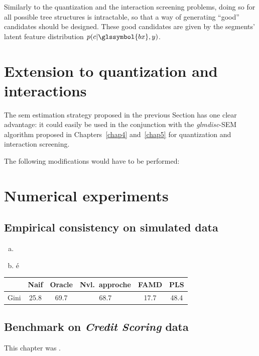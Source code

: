 Similarly to the quantization and the interaction screening problems, doing so for all possible tree structures is intractable, so that a way of generating ``good'' candidates should be designed. These good candidates are given by the segments' latent feature distribution $p(c | \glssymbol{bx}, y)$.


\section{Extension to quantization and interactions}

The \gls{sem} estimation strategy proposed in the previous Section has one clear advantage: it could easily be used in the conjunction with the \textit{glmdisc}-SEM algorithm proposed in Chapters~\ref{chap4} and~\ref{chap5} for quantization and interaction screening.

The following modifications would have to be performed:

\section{Numerical experiments} \label{sec:num_exp}



\subsection{Empirical consistency on simulated data} \label{subsec:num_sim}


\begin{enumerate}[(a)]
\item 
\item é
\end{enumerate}


\begin{table}[t]
\begin{center}
\begin{adjustbox}{max width=0.99\textwidth}

\begin{tabular}{c|c|c|c|c|c}
   & Naif & Oracle & Nvl.\ approche & FAMD & PLS \\
\hline Gini & 25.8 & 69.7 & 68.7 & 17.7 & 48.4 \\
\end{tabular}

\end{adjustbox}
\end{center}
\end{table}



\subsection{Benchmark on \textit{Credit Scoring} data}




\bigskip

This chapter was .


\printbibliography[heading=subbibliography, title=References of Chapter 5]


